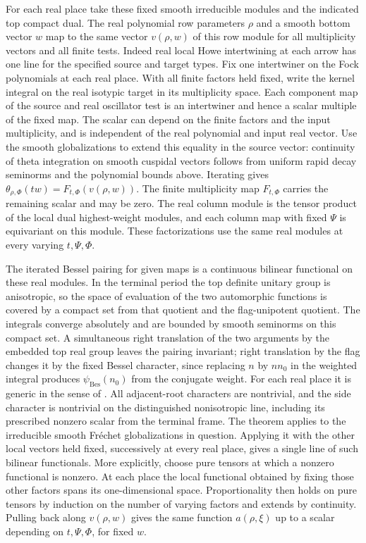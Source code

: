 For each real place take these fixed smooth irreducible modules
and the indicated top compact dual. The real
polynomial row parameters \(\rho\) and a smooth bottom vector
\(w\) map to the same vector \(v(\rho,w)\) of this row
module for all multiplicity vectors and all finite tests.
Indeed real local Howe intertwining at each arrow has one
line for the specified source and target types. Fix one
intertwiner on the Fock polynomials at each real place. With
all finite factors held fixed, write the kernel integral on
the real isotypic target in its multiplicity space. Each
component map of the source and real oscillator test is an
intertwiner and hence a scalar multiple of the fixed map.
The scalar can depend on the finite factors and the input
multiplicity, and is independent of the real polynomial and
input real vector. Use the smooth globalizations to extend
this equality in the source vector: continuity of theta
integration on smooth cuspidal vectors follows from uniform
rapid decay seminorms and the polynomial bounds above.
Iterating
gives \(\theta_{\rho,\Phi}(t w)=F_{t,\Phi}(v(\rho,w))\).
The finite multiplicity map \(F_{t,\Phi}\) carries the
remaining scalar and may be zero. The real column module
is the tensor product of the local dual highest-weight
modules, and each column map with fixed \(\Psi\) is
equivariant on this module. These factorizations use the
same real modules at every varying \(t,\Psi,\Phi\).

The iterated Bessel pairing for given maps is a continuous
bilinear functional on these real modules. In the terminal
period the top definite unitary group is anisotropic, so the
space of evaluation of the two automorphic functions is
covered by a compact set from that quotient and the
flag-unipotent quotient. The integrals converge absolutely
and are bounded by smooth seminorms on this compact set.
A simultaneous right translation of the two arguments by
the embedded top real group leaves the pairing invariant;
right translation by the flag changes it by the fixed Bessel
character, since replacing \(n\) by \(nn_0\) in the
weighted integral produces \(\psi_{\mathrm{Bes}}(n_0)\)
from the conjugate weight. For each real place it is generic in
the sense of
\cite[Theorem~A and \S2.2]{p2jiang-sun-zhu}. All adjacent-root characters are
nontrivial, and the side character is nontrivial on the
distinguished nonisotropic line, including its prescribed
nonzero scalar from the terminal frame. The theorem
applies to the irreducible smooth Fr\'echet
globalizations in question. Applying it with the other
local vectors held fixed, successively at every real place,
gives a single line of such bilinear functionals. More
explicitly, choose pure tensors at which a nonzero
functional is nonzero. At each place the local functional
obtained by fixing those other factors spans its
one-dimensional space. Proportionality then holds on pure
tensors by induction on the number of varying factors and
extends by continuity. Pulling back along \(v(\rho,w)\)
gives the same function \(a(\rho,\xi)\) up to a scalar
depending on \(t,\Psi,\Phi\), for fixed \(w\).

